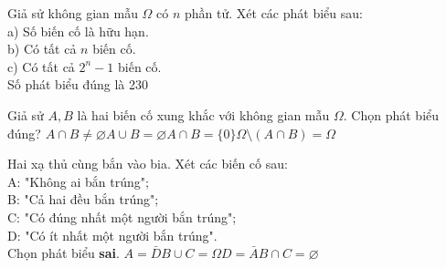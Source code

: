 \begin{ex}%
	Giả sử không gian mẫu $\Omega$ có $n$ phần tử. Xét các phát biểu sau:\\
	a) Số biến cố là hữu hạn.\\
	b) Có tất cả $n$ biến cố.\\
	c) Có tất cả $2^n-1$ biến cố.\\
	Số phát biểu đúng là
	\choice
	{}{2}{3}{0}
\end{ex}
\begin{ex}%
	Giả sử $A, B$ là hai biến cố xung khắc với không gian mẫu $\Omega$. Chọn phát biểu đúng?
	\choice
	{$A\cap B\neq\varnothing$}{$A\cup B=\varnothing$}{$A\cap B=\{0\}$}{\True $\Omega\setminus(A\cap B)=\Omega$}
\end{ex}
\begin{ex}%
	Hai xạ thủ cùng bắn vào bia. Xét các biến cố sau:\\
	A: "Không ai bắn trúng";\\
	B: "Cả hai đều bắn trúng";\\
	C: "Có đúng nhất một người bắn trúng";\\
	D: "Có ít nhất một người bắn trúng".\\
	Chọn phát biểu {\bf sai}.
	\choice
	{$A=\bar{D}$}{\True $B\cup C=\Omega$}{$D=\bar{A}$}{$B\cap C=\varnothing$}
\end{ex}


